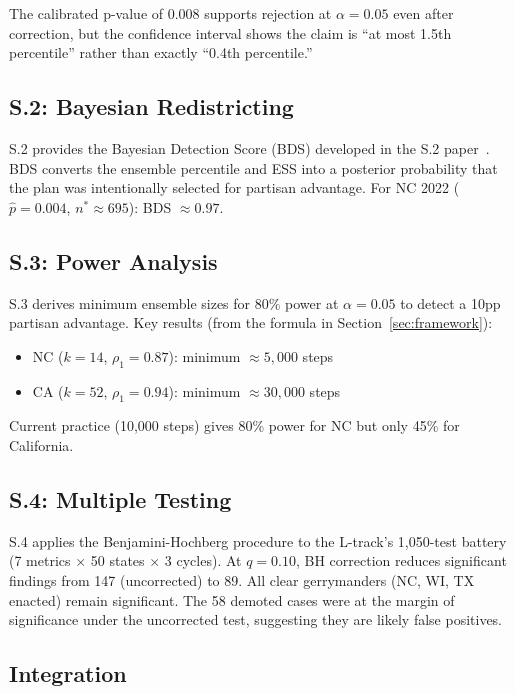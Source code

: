 The calibrated p-value of 0.008 supports rejection at $\alpha = 0.05$
even after correction, but the confidence interval shows the claim is
``at most 1.5th percentile'' rather than exactly ``0.4th percentile.''

\subsection{S.2: Bayesian Redistricting}

S.2 provides the Bayesian Detection Score (BDS) developed in the
S.2 paper~\citep{s2paper}.
BDS converts the ensemble percentile and ESS into a posterior probability
that the plan was intentionally selected for partisan advantage.
For NC 2022 ($\hat{p} = 0.004$, $n^* \approx 695$): BDS $\approx 0.97$.

\subsection{S.3: Power Analysis}

S.3 derives minimum ensemble sizes for 80\% power at $\alpha = 0.05$
to detect a 10pp partisan advantage.
Key results (from the formula in Section~\ref{sec:framework}):
\begin{itemize}
\item NC ($k = 14$, $\rho_1 = 0.87$): minimum $\approx 5{,}000$ steps
\item CA ($k = 52$, $\rho_1 = 0.94$): minimum $\approx 30{,}000$ steps
\end{itemize}
Current practice (10,000 steps) gives 80\% power for NC but only 45\%
for California.

\subsection{S.4: Multiple Testing}

S.4 applies the Benjamini-Hochberg procedure to the L-track's 1,050-test
battery (7 metrics $\times$ 50 states $\times$ 3 cycles).
At $q = 0.10$, BH correction reduces significant findings from 147
(uncorrected) to 89.
All clear gerrymanders (NC, WI, TX enacted) remain significant.
The 58 demoted cases were at the margin of significance under the
uncorrected test, suggesting they are likely false positives.

\subsection{Integration}

